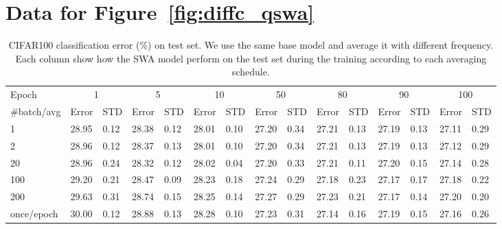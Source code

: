 \clearpage
\section{Data for Figure~\ref{fig:diffc_qswa}}\label{sec:data-figure3}



\begin{table}[h]
\label{table:figure3-data-diffc}

\caption{CIFAR100 classification error (\%) on test set. We use the same base model and average it with different frequency. Each column show how the SWA model perform on the test set during the training according to each averaging schedule. }
\centering
\begin{tabular}{@{}lllllllllllllll@{}}
\toprule
Epoch   & \multicolumn{2}{c}{1} & \multicolumn{2}{c}{5} & \multicolumn{2}{c}{10} & \multicolumn{2}{c}{50} & \multicolumn{2}{c}{80} & \multicolumn{2}{c}{90} & \multicolumn{2}{c}{100} \\
\#batch/avg & Error         & STD        & Error         & STD        & Error          & STD        & Error          & STD        & Error          & STD        & Error          & STD        & Error          & STD         \\ \midrule
1                 & 28.95       & 0.12       & 28.38       & 0.12       & 28.01        & 0.10       & 27.20        & 0.34       & 27.21        & 0.13       & 27.19        & 0.13       & 27.11        & 0.29        \\
2                 & 28.96       & 0.12       & 28.37       & 0.13       & 28.01        & 0.10       & 27.20        & 0.34       & 27.21        & 0.13       & 27.19        & 0.13       & 27.12        & 0.29        \\
20                & 28.96       & 0.24       & 28.32       & 0.12       & 28.02        & 0.04       & 27.20        & 0.33       & 27.21        & 0.11       & 27.20        & 0.15       & 27.14        & 0.28        \\
100               & 29.20       & 0.21       & 28.47       & 0.09       & 28.23        & 0.18       & 27.24        & 0.29       & 27.18        & 0.23       & 27.17        & 0.17       & 27.18        & 0.22        \\
200               & 29.63       & 0.31       & 28.74       & 0.15       & 28.25        & 0.14       & 27.27        & 0.29       & 27.23        & 0.21       & 27.17        & 0.14       & 27.20        & 0.20        \\
once/epoch                & 30.00       & 0.12       & 28.88       & 0.13       & 28.28        & 0.10       & 27.23        & 0.31       & 27.14        & 0.16       & 27.19        & 0.15       & 27.16        & 0.26        \\ \bottomrule
\end{tabular}
\end{table}

